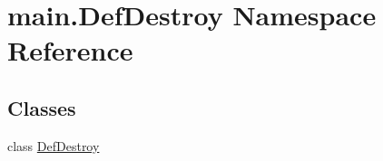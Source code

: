 \hypertarget{namespacemain_1_1_def_destroy}{\section{main.\-Def\-Destroy Namespace Reference}
\label{namespacemain_1_1_def_destroy}
}
\subsection*{Classes}
\begin{DoxyCompactItemize}
\item 
class \hyperlink{classmain_1_1_def_destroy_1_1_def_destroy}{Def\-Destroy}
\end{DoxyCompactItemize}
